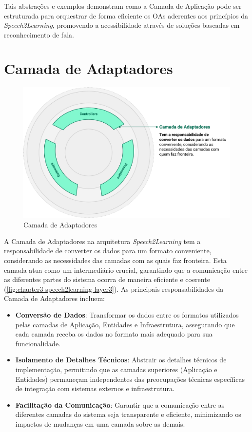 Tais abstrações e exemplos demonstram como a Camada de Aplicação pode ser estruturada para orquestrar de forma eficiente os OAs aderentes aos princípios da \textit{Speech2Learning}, promovendo a acessibilidade através de soluções baseadas em reconhecimento de fala.

\section{Camada de Adaptadores}

\begin{figure}[htb]
\centering
\caption{Camada de Adaptadores}
\label{fig:chapter3-speech2learning-layer3}
\includegraphics[width=.98\textwidth]{images/chapter3-speech2learning-layer3.png}
\end{figure}

A Camada de Adaptadores na arquitetura \textit{Speech2Learning} tem a responsabilidade de converter os dados para um formato conveniente, considerando as necessidades das camadas com as quais faz fronteira. Esta camada atua como um intermediário crucial, garantindo que a comunicação entre as diferentes partes do sistema ocorra de maneira eficiente e coerente (\autoref{fig:chapter3-speech2learning-layer3}). As principais responsabilidades da Camada de Adaptadores incluem:

\begin{itemize}
    \item \textbf{Conversão de Dados}: Transformar os dados entre os formatos utilizados pelas camadas de Aplicação, Entidades e Infraestrutura, assegurando que cada camada receba os dados no formato mais adequado para sua funcionalidade.

    \item \textbf{Isolamento de Detalhes Técnicos}: Abstrair os detalhes técnicos de implementação, permitindo que as camadas superiores (Aplicação e Entidades) permaneçam independentes das preocupações técnicas específicas de integração com sistemas externos e infraestrutura.

    \item \textbf{Facilitação da Comunicação}: Garantir que a comunicação entre as diferentes camadas do sistema seja transparente e eficiente, minimizando os impactos de mudanças em uma camada sobre as demais.
\end{itemize}

